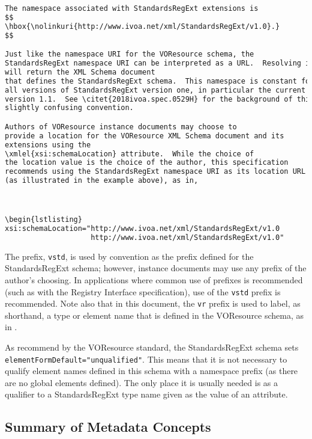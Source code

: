 \documentclass[11pt,a4paper]{ivoa}
\begin{document}
\begin{lstlisting}[language=xml]
The namespace associated with StandardsRegExt extensions is
$$
\hbox{\nolinkuri{http://www.ivoa.net/xml/StandardsRegExt/v1.0}.}
$$

Just like the namespace URI for the VOResource schema, the
StandardsRegExt namespace URI can be interpreted as a URL.  Resolving it
will return the XML Schema document
that defines the StandardsRegExt schema.  This namespace is constant for
all versions of StandardsRegExt version one, in particular the current
version 1.1.  See \citet{2018ivoa.spec.0529H} for the background of this
slightly confusing convention.

Authors of VOResource instance documents may choose to
provide a location for the VOResource XML Schema document and its
extensions using the
\xmlel{xsi:schemaLocation} attribute.  While the choice of
the location value is the choice of the author, this specification
recommends using the StandardsRegExt namespace URI as its location URL
(as illustrated in the example above), as in,



\begin{lstlisting}
xsi:schemaLocation="http://www.ivoa.net/xml/StandardsRegExt/v1.0
                    http://www.ivoa.net/xml/StandardsRegExt/v1.0"
\end{lstlisting}

The prefix, \texttt{vstd}, is used by convention as the
prefix defined for the StandardsRegExt schema; however, instance documents
may use any prefix of the author's choosing.  In applications where
common use of prefixes is recommended (such as with the Registry
Interface specification), use of the
\texttt{vstd} prefix is recommended.  Note also that in this
document, the \texttt{vr} prefix is used to label, as shorthand, a
type or element name that is defined in the VOResource schema, as in
. 



As recommend by the VOResource standard, the
StandardsRegExt schema sets \verb|elementFormDefault="unqualified"|.
This means that it is not necessary to qualify element names defined
in this schema with a namespace prefix (as there are no global
elements defined).  The only place it is usually needed is as a
qualifier to a StandardsRegExt type name given as the value of an
 attribute.  



\subsection{Summary of Metadata Concepts}
\end{document}
